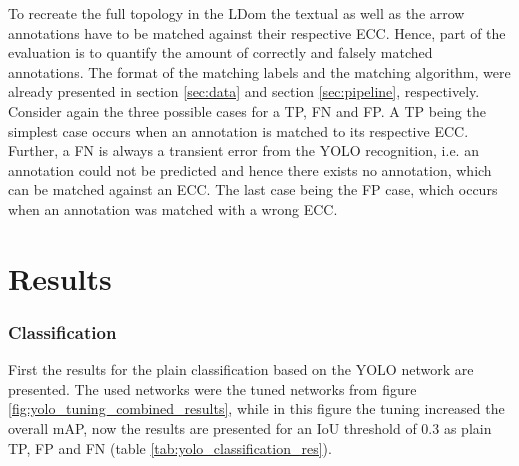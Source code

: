 To recreate the full topology in the \ac{LDom} the textual as well as the arrow annotations have to be matched against their respective \ac{ECC}.
Hence, part of the evaluation is to quantify the amount of correctly and falsely matched annotations.
The format of the matching labels and the matching algorithm, were already presented in section \ref{sec:data} and section \ref{sec:pipeline}, respectively.
Consider again the three possible cases for a \ac{TP}, \ac{FN} and \ac{FP}.
A \ac{TP} being the simplest case occurs when an annotation is matched to its respective \ac{ECC}.
Further, a \ac{FN} is always a transient error from the YOLO recognition, i.e. an annotation could not be predicted and hence there exists no annotation, which can be matched against an \ac{ECC}.
The last case being the \ac{FP} case, which occurs when an annotation was matched with a wrong \ac{ECC}.

\section{Results}
\label{sec:evaluation_results}

\subsubsection{Classification}
First the results for the plain classification based on the \ac{YOLO} network are presented.
The used networks were the tuned networks from figure \ref{fig:yolo_tuning_combined_results}, while in this figure the tuning increased the overall \ac{mAP}, now the results are presented for an \ac{IoU} threshold of 0.3 as plain \ac{TP}, \ac{FP} and \ac{FN} (table \ref{tab:yolo_classification_res}).

